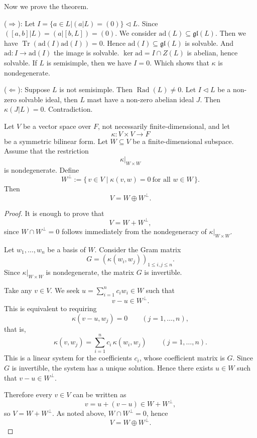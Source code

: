 Now we prove the theorem.

($\Rightarrow$): Let $I=\{ a \in L | (a|L)=(0) \}  \triangleleft L $. Since $([a,b]|L)=(a|[b,L])=(0)$. We consider $\mathrm{ad}(L) \subseteq \mathfrak{gl}(L)$. Then we have $\operatorname{Tr}(\mathrm{ad}(I)\mathrm{ad}(I))=0$. Hence $\mathrm{ad}(I) \subseteq \mathfrak{gl}(L)$ is solvable. And $ \mathrm{ad}: I \to \mathrm{ad}(I)$ the image is solvable. $\ker \mathrm{ad}=I \cap Z(L) $ is abelian, hence solvable. If $L$ is semisimple, then we have $I=0$. Which shows that $\kappa$ is nondegenerate.

($\Leftarrow$): Suppose $L$ is not semisimple. Then $\operatorname{Rad}(L) \neq 0$. Let $I \triangleleft L$ be a non-zero solvable ideal, then $L$ mast have a non-zero abelian ideal $J$. Then $\kappa(J|L)=0$. Contradiction.

\begin{proposition}
    Let $V$ be a vector space over $F$, not necessarily finite-dimensional, and let
    \[
        \kappa:V\times V\to F
    \]
    be a symmetric bilinear form. Let $W\subseteq V$ be a finite-dimensional subspace.
    Assume that the restriction
    \[
        \kappa|_{W\times W}
    \]
    is nondegenerate. Define
    \[
        W^\perp:=\{\,v\in V\mid \kappa(v,w)=0\ \text{for all } w\in W\,\}.
    \]
    Then
    \[
        V=W\oplus W^\perp.
    \]
\end{proposition}

\begin{proof}
    It is enough to prove that
    \[
        V=W+W^\perp,
    \]
    since $W\cap W^\perp=0$ follows immediately from the nondegeneracy of $\kappa|_{W\times W}$.

    Let $w_1,\dots,w_n$ be a basis of $W$. Consider the Gram matrix
    \[
        G=(\kappa(w_i,w_j))_{1\le i,j\le n}.
    \]
    Since $\kappa|_{W\times W}$ is nondegenerate, the matrix $G$ is invertible.

    Take any $v\in V$. We seek $u=\sum_{i=1}^n c_i w_i\in W$ such that
    \[
        v-u\in W^\perp.
    \]
    This is equivalent to requiring
    \[
        \kappa(v-u,w_j)=0
        \qquad (j=1,\dots,n),
    \]
    that is,
    \[
        \kappa(v,w_j)=\sum_{i=1}^n c_i\,\kappa(w_i,w_j)
        \qquad (j=1,\dots,n).
    \]
    This is a linear system for the coefficients $c_i$, whose coefficient matrix is $G$.
    Since $G$ is invertible, the system has a unique solution. Hence there exists $u\in W$
    such that $v-u\in W^\perp$.

    Therefore every $v\in V$ can be written as
    \[
        v=u+(v-u)\in W+W^\perp,
    \]
    so $V=W+W^\perp$. As noted above, $W\cap W^\perp=0$, hence
    \[
        V=W\oplus W^\perp.
    \]
\end{proof}

